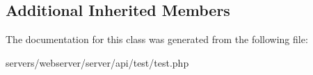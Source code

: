 \subsection*{Additional Inherited Members}


The documentation for this class was generated from the following file\+:\begin{DoxyCompactItemize}
\item 
servers/webserver/server/api/test/test.\+php\end{DoxyCompactItemize}
